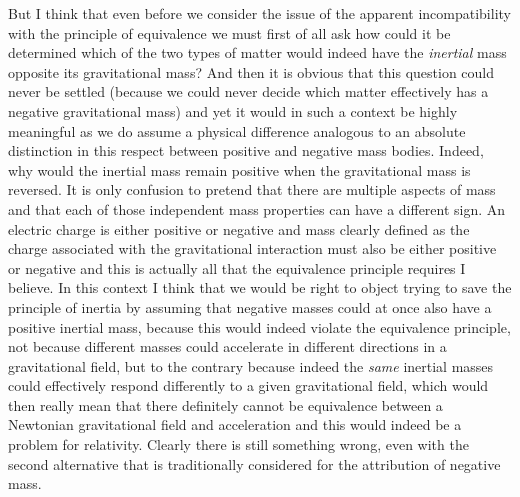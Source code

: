 \documentclass[notitlepage,12pt]{report}
\begin{document}
But I think that even before we consider the issue of the apparent incompatibility with the principle of equivalence we must first of all ask how could it be determined which of the two types of matter would indeed have the \textit{inertial} mass opposite its gravitational mass? And then it is obvious that this question could never be settled (because we could never decide which matter effectively has a negative gravitational mass) and yet it would in such a context be highly meaningful as we do assume a physical difference analogous to an absolute distinction in this respect between positive and negative mass bodies. Indeed, why would the inertial mass remain positive when the gravitational mass is reversed. It is only confusion to pretend that there are multiple aspects of mass and that each of those independent mass properties can have a different sign. An electric charge is either positive or negative and mass clearly defined as the charge associated with the gravitational interaction must also be either positive or negative and this is actually all that the equivalence principle requires I believe. In this context I think that we would be right to object trying to save the principle of inertia by assuming that negative masses could at once also have a positive inertial mass, because this would indeed violate the equivalence principle, not because different masses could accelerate in different directions in a gravitational field, but to the contrary because indeed the \textit{same} inertial masses could effectively respond differently to a given gravitational field, which would then really mean that there definitely cannot be equivalence between a Newtonian gravitational field and acceleration and this would indeed be a problem for relativity. Clearly there is still something wrong, even with the second alternative that is traditionally considered for the attribution of negative mass.
\end{document}
